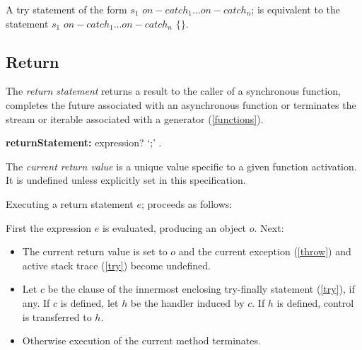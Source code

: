 \documentclass{article}
\newcommand{\code}[1]{{\sf #1}}
\begin{document}
\LMHash{}
A try statement of the form \code{\TRY{} $s_1$ $on-catch_1 \ldots on-catch_n$;} is equivalent to the statement \code{\TRY{} $s_1$ $on-catch_1 \ldots on-catch_n$ \FINALLY{} $\{\}$}.


\subsection{ Return}

\LMHash{}
The {\em return statement} returns a result to the caller of a synchronous function,  completes the future associated with an asynchronous function or terminates the stream or iterable associated with a generator (\ref{functions}).


 \begin{grammar}
{\bf returnStatement:}
    \RETURN{} expression? `{\escapegrammar ;}' %
    .
 \end{grammar}


\LMHash{}
The {\em current return value} is a unique value specific to a given function activation. It is undefined unless explicitly set in this specification.

\LMHash{}
Executing a return statement \code{\RETURN{} $e$;} proceeds as follows:

\LMHash{}
First the expression $e$ is evaluated, producing an object $o$. Next:
\begin{itemize}
\item
The current return value is set to $o$ and the current exception (\ref{throw}) and active stack trace (\ref{try}) become undefined.
\item
Let $c$ be the \FINALLY{} clause of the innermost enclosing try-finally statement (\ref{try}), if any. If $c$ is defined, let $h$ be the handler induced by $c$. If $h$ is defined, control is transferred to $h$.
\item
Otherwise execution of the current method terminates.
\end{itemize}
\end{document}
